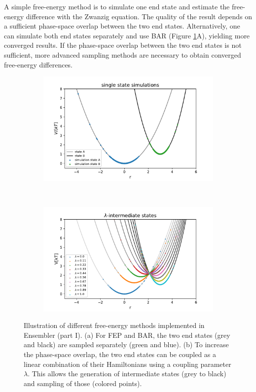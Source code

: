 A simple free-energy method is to simulate one end state and estimate the free-energy difference with the Zwanzig equation.\cite{Zwanzig1954} The quality of the result depends on a sufficient phase-space overlap between the two end states.\cite{Konig2018}
Alternatively, one can simulate both end states separately and use BAR\cite{Bennett1976} (Figure \ref{fig:FE_sampling}A), yielding more converged results.\cite{Konig2018}
If the phase-space overlap between the two end states is not sufficient, more advanced sampling methods are necessary to obtain converged free-energy differences.
%
\begin{figure}[h]
	\centering
	\begin{subfigure}{.85\textwidth}
		\caption{}
		\includegraphics[width=\linewidth]{fig/FE_example/freeEnergyPertubation.pdf} 
	\end{subfigure}\\
	\begin{subfigure}{.85\textwidth}
		\caption{}
		\includegraphics[width=\linewidth]{fig/FE_example/linear_coupled.pdf} 
	\end{subfigure}
	\caption{Illustration of different free-energy methods implemented in Ensembler (part I). (a) For FEP\cite{Zwanzig1954} and BAR\cite{Bennett1976}, the two end states (grey and black) are sampled separately (green and blue). (b) To increase the phase-space overlap, the two end states can be coupled as a linear combination of their Hamiltonians using a coupling parameter $\lambda$. This allows the generation of intermediate states (grey to black) and sampling of those (colored points).}
	\label{fig:FE_sampling}
\end{figure}
